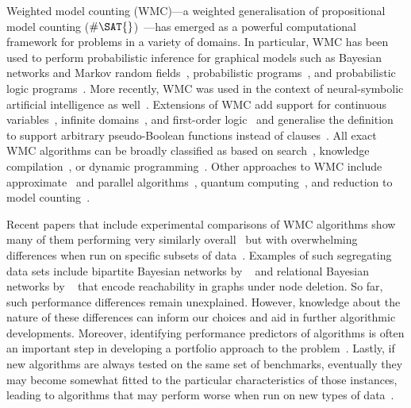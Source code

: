\documentclass[letterpaper]{article} %
\theoremstyle{definition}
\theoremstyle{remark}
\begin{document}
Weighted model counting (\textsf{WMC})---a weighted generalisation of
propositional model counting
($\#\SAT{}$)~\cite{DBLP:journals/ai/ChaviraD08}---has emerged as a powerful
computational framework for problems in a variety of domains. In particular,
\textsf{WMC} has been used to perform probabilistic inference for graphical
models such as Bayesian networks and Markov random
fields~\cite{DBLP:conf/ecai/BartKLM16,DBLP:conf/ijcai/ChaviraD05,DBLP:conf/sat/ChaviraD06,DBLP:conf/kr/Darwiche02,DBLP:conf/aaai/SangBK05},
probabilistic programs~\cite{DBLP:journals/pacmpl/HoltzenBM20}, and
probabilistic logic programs~\cite{DBLP:journals/tplp/FierensBRSGTJR15}. More
recently, \textsf{WMC} was used in the context of neural-symbolic artificial
intelligence as well~\cite{DBLP:conf/icml/XuZFLB18}. Extensions of \textsf{WMC}
add support for continuous variables~\cite{DBLP:conf/ijcai/BellePB15}, infinite
domains~\cite{DBLP:conf/aaai/Belle17}, and first-order
logic~\cite{DBLP:conf/ijcai/BroeckTMDR11,DBLP:journals/cacm/GogateD16} and
generalise the definition to support arbitrary pseudo-Boolean functions instead
of clauses~\cite{DBLP:conf/sat/DilkasB21}.
All exact \textsf{WMC} algorithms can be broadly classified as based on
search~\cite{DBLP:conf/sat/SangBBKP04}, knowledge
compilation~\cite{DBLP:conf/ecai/Darwiche04,DBLP:conf/ijcai/LagniezM17,DBLP:conf/ijcai/OztokD15},
or dynamic programming~\cite{DBLP:conf/aaai/DudekPV20,DBLP:conf/cp/DudekPV20}.
Other approaches to \textsf{WMC} include
approximate~\cite{DBLP:conf/aaai/RenkensKBR14} and parallel
algorithms~\cite{DBLP:conf/pgm/DalLL18,DBLP:conf/esa/FichteHWZ18}, quantum
computing~\cite{DBLP:conf/ecai/Riguzzi20}, and reduction to model
counting~\cite{DBLP:conf/ijcai/ChakrabortyFMV15}.

Recent papers that include experimental comparisons of \textsf{WMC}
algorithms show many of them performing very similarly
overall~\cite{DBLP:conf/aaai/DudekPV20,DBLP:conf/cp/DudekPV20} but with
overwhelming differences when run on specific subsets of
data~\cite{my_uai_paper,DBLP:conf/sat/DilkasB21,DBLP:conf/ijcai/LagniezM17}.
Examples of such segregating data sets include bipartite Bayesian networks by
\citeauthor{DBLP:conf/aaai/SangBK05}~ and
relational Bayesian networks by
\citeauthor{DBLP:journals/ijar/ChaviraDJ06}~
that encode reachability in graphs under node deletion. So far, such performance
differences remain unexplained. However, knowledge about the nature of these
differences can inform our choices and aid in further algorithmic developments.
Moreover, identifying performance predictors of algorithms is often an important
step in developing a portfolio approach to the
problem~\cite{DBLP:journals/jair/XuHHL08}. Lastly, if new algorithms are always
tested on the same set of benchmarks, eventually they may become somewhat fitted
to the particular characteristics of those instances, leading to algorithms that
may perform worse when run on new types of
data~\cite{DBLP:conf/cec/HossainALA10}.
\end{document}
